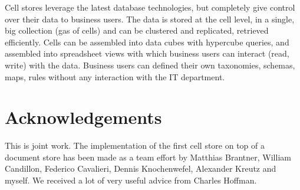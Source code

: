 \documentclass{vldb}
\begin{document}
Cell stores leverage the latest database technologies, but completely give control over their data to business users. The data is stored at the cell level, in a single, big collection (gas of cells) and can be clustered and replicated, retrieved efficiently. Cells can be assembled into data cubes with hypercube queries, and assembled into spreadsheet views with which business users can interact (read, write) with the data. Business users can defined their own taxonomies, schemas, maps, rules without any interaction with the IT department.

\section{Acknowledgements}

This is joint work. The implementation of the first cell store on top of a document store has been made as a team effort by Matthias Brantner, William Candillon, Federico Cavalieri, Dennis Knochenwefel, Alexander Kreutz and myself. We received a lot of very useful advice from Charles Hoffman.





\end{document}
